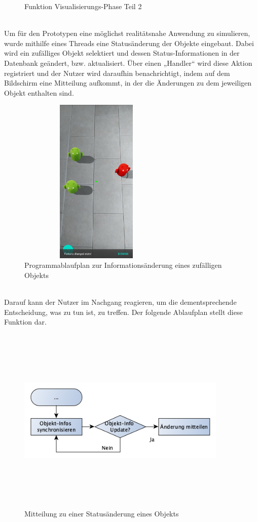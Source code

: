 \begin{figure}[hbt!]
    \caption{Funktion Visualisierungs-Phase Teil 2}
    \label{pic:showdatatoobj}
\end{figure}
\pagebreak
\\
Um für den Prototypen eine möglichst realitätsnahe Anwendung zu simulieren, wurde mithilfe eines Threads eine Statusänderung der Objekte eingebaut. Dabei wird 
ein zufälliges Objekt selektiert und dessen Status-Informationen in der Datenbank geändert, bzw. aktualisiert. Über einen „Handler“ wird diese Aktion registriert 
und der Nutzer wird daraufhin benachrichtigt, indem auf dem Bildschirm eine Mitteilung aufkommt, in der die Änderungen zu dem jeweiligen Objekt 
enthalten sind. 
\begin{figure}[hbt!]
    \centering
    \includegraphics[width=7.5cm,height=8cm,keepaspectratio]{4Umsetzung/Bilder/changeState.jpeg}
    \caption{Programmablaufplan zur Informationsänderung eines zufälligen Objekts}
    \label{pic:startmenu}
\end{figure}
\pagebreak
\\
Darauf kann der Nutzer im Nachgang reagieren, um die dementsprechende Entscheidung, was zu tun ist, zu treffen. Der folgende Ablaufplan stellt 
diese Funktion dar.
\begin{figure}[hbt!]
    \centering
    \includegraphics[width=10cm,height=9cm,keepaspectratio]{4Umsetzung/Bilder/changeInfoPAP.png}
    \caption{Mitteilung zu einer Statusänderung eines Objekts}
    \label{pic:startmenu}
\end{figure}
